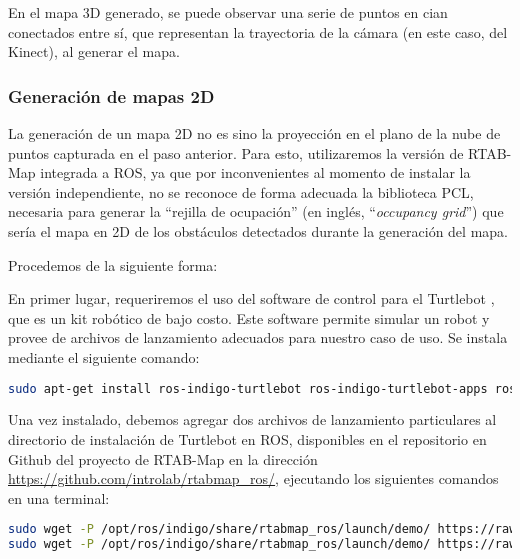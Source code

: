 En el mapa 3D generado, se puede observar una serie de puntos en cian conectados entre sí, que representan la trayectoria de la cámara (en este caso, del Kinect), al generar el mapa.

\subsubsection{Generación de mapas 2D}

La generación de un mapa 2D no es sino la proyección en el plano de la nube de puntos capturada en el paso anterior. Para esto, utilizaremos la versión de RTAB-Map integrada a ROS, ya que por inconvenientes al momento de instalar la versión independiente, no se reconoce de forma adecuada la biblioteca PCL, necesaria para generar la ``rejilla de ocupación'' (en inglés, ``\textit{occupancy grid}'') que sería el mapa en 2D de los obstáculos detectados durante la generación del mapa.

Procedemos de la siguiente forma:

En primer lugar, requeriremos el uso del software de control para el Turtlebot \cite{turtlebot}, que es un kit robótico de bajo costo. Este software permite simular un robot y provee de archivos de lanzamiento adecuados para nuestro caso de uso. Se instala mediante el siguiente comando:

\begin{blackcodebox}
\begin{lstlisting}[language=bash]
sudo apt-get install ros-indigo-turtlebot ros-indigo-turtlebot-apps ros-indigo-turtlebot-interactions ros-indigo-turtlebot-simulator ros-indigo-kobuki-ftdi ros-indigo-rocon-remocon ros-indigo-rocon-qt-library ros-indigo-ar-track-alvar-msgs
\end{lstlisting}
\end{blackcodebox}

Una vez instalado, debemos agregar dos archivos de lanzamiento particulares al directorio de instalación de Turtlebot en ROS, disponibles en el repositorio en Github del proyecto de RTAB-Map en la dirección \url{https://github.com/introlab/rtabmap_ros/}, ejecutando los siguientes comandos en una terminal:

\begin{blackcodebox}
\begin{lstlisting}[language=bash]
sudo wget -P /opt/ros/indigo/share/rtabmap_ros/launch/demo/ https://raw.githubusercontent.com/introlab/rtabmap_ros/master/launch/demo/demo_turtlebot_mapping.launch
sudo wget -P /opt/ros/indigo/share/rtabmap_ros/launch/demo/ https://raw.githubusercontent.com/introlab/rtabmap_ros/master/launch/demo/demo_turtlebot_rviz.launch
\end{lstlisting}
\end{blackcodebox}

